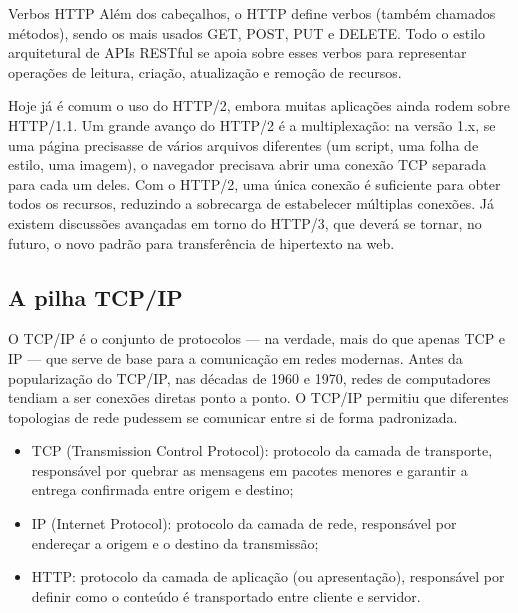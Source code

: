 \begin{infobox}{Verbos HTTP}
Além dos cabeçalhos, o HTTP define verbos (também chamados métodos), sendo os mais usados GET, POST, PUT e DELETE. Todo o estilo arquitetural de APIs RESTful se apoia sobre esses verbos para representar operações de leitura, criação, atualização e remoção de recursos.
\end{infobox}

Hoje já é comum o uso do HTTP/2, embora muitas aplicações ainda rodem sobre HTTP/1.1. Um grande avanço do HTTP/2 é a multiplexação: na versão 1.x, se uma página precisasse de vários arquivos diferentes (um script, uma folha de estilo, uma imagem), o navegador precisava abrir uma conexão TCP separada para cada um deles. Com o HTTP/2, uma única conexão é suficiente para obter todos os recursos, reduzindo a sobrecarga de estabelecer múltiplas conexões. Já existem discussões avançadas em torno do HTTP/3, que deverá se tornar, no futuro, o novo padrão para transferência de hipertexto na web.

\subsection{A pilha TCP/IP}

O TCP/IP é o conjunto de protocolos — na verdade, mais do que apenas TCP e IP — que serve de base para a comunicação em redes modernas. Antes da popularização do TCP/IP, nas décadas de 1960 e 1970, redes de computadores tendiam a ser conexões diretas ponto a ponto. O TCP/IP permitiu que diferentes topologias de rede pudessem se comunicar entre si de forma padronizada.

\begin{itemize}
  \item TCP (Transmission Control Protocol): protocolo da camada de transporte, responsável por quebrar as mensagens em pacotes menores e garantir a entrega confirmada entre origem e destino;
\end{itemize}

\begin{itemize}
  \item IP (Internet Protocol): protocolo da camada de rede, responsável por endereçar a origem e o destino da transmissão;
\end{itemize}

\begin{itemize}
  \item HTTP: protocolo da camada de aplicação (ou apresentação), responsável por definir como o conteúdo é transportado entre cliente e servidor.
\end{itemize}


